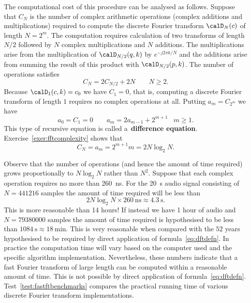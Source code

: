 \documentclass[11pt,a4paper]{book}
\theoremstyle{plain}
\numberwithin{equation}{section}
\newcommand{\term}{\textbf}
\newcounter{test}
\begin{document}
The computational cost of this procedure can be analysed as follows.  Suppose that $C_N$ is the number of complex arithmetic operations (complex additions and multiplications) required to compute the discrete Fourier transform $\calD_N(c)$ of length $N = 2^m$.  The computation requires calculation of two transforms of length $N/2$ followed by $N$ complex multiplications and $N$ additions.  The multiplications arise from the multiplication of $\calD_{N/2}(q, k)$ by $e^{-j 2\pi k / N}$ and the additions arise from summing the result of this product with $\calD_{N/2}(p, k)$.  The number of operations satisfies
\[
C_N = 2C_{N/2} + 2N \qquad N \geq 2.
\]
Because $\calD_1(c,k) = c_0$ we have $C_1 = 0$, that is, computing a discrete Fourier transform of length $1$ requires no complex operations at all.  Putting $a_m = C_{2^m}$ we have
\[
a_0 = C_1 = 0 \qquad a_m = 2 a_{m-1} + 2^{m+1} \;\;\; m \geq 1.
\]
This type of recursive equation is called a~\term{difference equation}.  %
Exercise~\ref{exer:fftcomplexity} shows that
\[
C_{N} = a_{m} = 2^{m+1}m = 2N\log_2 N.
\]

Observe that the number of operations (and hence the amount of time required) grows proportionally to $N\log_2 N$ rather than $N^2$.  Suppose that each complex operation requires no more than \SI{260}{\nano\second}.  For the \SI{20}{\second} audio signal consisting of $N = 441216$ samples the amount of time required will be less than
\begin{equation}\label{eq:runtimefftcooleytukeyapprox}
2N \log_2 N \times \SI{260}{\nano\second} \approx \SI{4.3}{\second}.
\end{equation} 
This is more reasonable than 14 hours!  If instead we have 1 hour of audio and $N = 79380000$ samples the amount of time required is hypothesised to be less than $\SI{1084}{\second} \approx \SI{18}{\minute}$.  This is very reasonable when compared with the $52$ years hypothesised to be required by direct application of formula~\eqref{eq:dftdefn}.  In practice the computation time will vary based on the computer used and the specific algorithm implementation.  Nevertheless, these numbers indicate that a fast Fourier transform of large length can be computed within a reasonable amount of time.  This is not possible by direct application of formula~\eqref{eq:dftdefn}.  Test~\ref{test:fastftbenchmarks} compares the practical running time of various discrete Fourier transform implementations.
\end{document}
